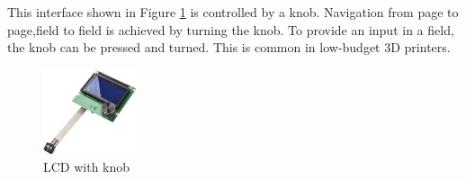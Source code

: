 \begin{enumerate}
    \par
    This interface shown in Figure \ref{fig:lcd_with_knobs} is controlled by a knob. Navigation from page to page,field to field is achieved by turning the knob. To provide an input in a field, the knob can be pressed and turned. This is common in low-budget 3D printers.
    \begin{figure}[H]
        \centering
        \includegraphics[width=0.25\textwidth,height=.25\textheight]{Figures/lcdwithknob.png}
        \caption[Lcd with knob]{LCD with knob \cite{noauthor_prusa_nodate}}
        \label{fig:lcd_with_knobs}
    \end{figure}
\end{enumerate}

